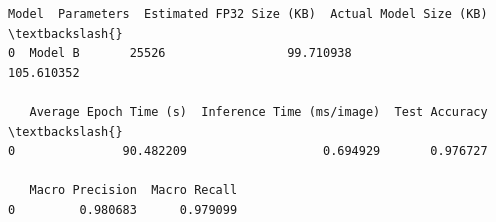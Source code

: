 \documentclass[11pt]{article}
\makeatletter
\newcommand{\boxspacing}{\kern\kvtcb@left@rule\kern\kvtcb@boxsep}
\newcommand{\prompt}[4]{
        {\ttfamily\llap{{\color{#2}[#3]:\hspace{3pt}#4}}\vspace{-\baselineskip}}
    }
\makeatother
\begin{document}
            \begin{tcolorbox}[breakable, size=fbox, boxrule=.5pt, pad at break*=1mm, opacityfill=0]
\prompt{Out}{outcolor}{23}{\boxspacing}
\begin{Verbatim}[commandchars=\\\{\}]
     Model  Parameters  Estimated FP32 Size (KB)  Actual Model Size (KB)  \textbackslash{}
0  Model B       25526                 99.710938              105.610352

   Average Epoch Time (s)  Inference Time (ms/image)  Test Accuracy  \textbackslash{}
0               90.482209                   0.694929       0.976727

   Macro Precision  Macro Recall
0         0.980683      0.979099
\end{Verbatim}
\end{tcolorbox}
        

    
    
    
\end{document}
